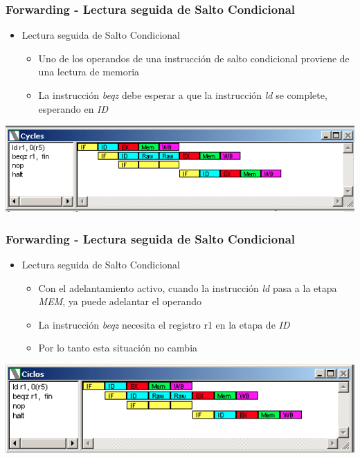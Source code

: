 \documentclass{beamer}
\begin{document}
\begin{frame}[fragile]
\frametitle{Forwarding - Lectura seguida de Salto Condicional}
\begin{itemize}
\item Lectura seguida de Salto Condicional
\begin{itemize}
\item Uno de los operandos de una instrucción de salto condicional proviene de una lectura de memoria
\item La instrucción \emph{beqz} debe esperar a que la instrucción \emph{ld} se complete, esperando en \emph{ID}
\end{itemize}
\end{itemize}
\includegraphics[scale=0.45]{forwarding-3.png}
\end{frame}

\begin{frame}[fragile]
\frametitle{Forwarding - Lectura seguida de Salto Condicional}
\begin{itemize}
\item Lectura seguida de Salto Condicional
\begin{itemize}
\item Con el adelantamiento activo, cuando la instrucción \emph{ld} pasa a la etapa \emph{MEM}, ya puede adelantar el operando
\item La instrucción \emph{beqz} necesita el registro r1 en la etapa de \emph{ID}
\item Por lo tanto esta situación no cambia
\end{itemize}
\end{itemize}
\includegraphics[scale=0.45]{forwarding-3-lectura-beq.png}
\end{frame}
\end{document}
